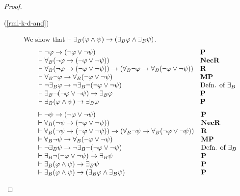 \begin{proof}
\begin{description}
    \item[(\ref{rml-k-d-and})]
    We show that $\vdash {\exists_{B}} (\varphi \land \psi) \rightarrow ({\exists_{B}} \varphi \land {\exists_{B}} \psi)$.
    $$
    \begin{array}{ll}
        \vdash \lnot \varphi \rightarrow (\lnot \varphi \lor \lnot \psi) & {\bf P}\\
        \vdash {\forall_{B}} (\lnot \varphi \rightarrow (\lnot \varphi \lor \lnot \psi)) & {\bf NecR}\\
        \vdash {\forall_{B}} (\lnot \varphi \rightarrow (\lnot \varphi \lor \lnot \psi)) \rightarrow ({\forall_{B}} \lnot \varphi \rightarrow {\forall_{B}} (\lnot \varphi \lor \lnot \psi)) & {\bf R}\\
        \vdash {\forall_{B}} \lnot \varphi \rightarrow {\forall_{B}} (\lnot \varphi \lor \lnot \psi) & {\bf MP}\\
        \vdash \lnot {\exists_{B}} \varphi \rightarrow \lnot {\exists_{B}} \lnot (\lnot \varphi \lor \lnot \psi) & \text{Defn. of ${\exists_{B}}$}\\
        \vdash {\exists_{B}} \lnot (\lnot \varphi \lor \lnot \psi) \rightarrow {\exists_{B}} \varphi  & {\bf P}\\
        \vdash {\exists_{B}} (\varphi \land \psi) \rightarrow {\exists_{B}} \varphi  & {\bf P}\\
    \end{array}
    $$
    $$
    \begin{array}{ll}
        \vdash \lnot \psi \rightarrow (\lnot \varphi \lor \lnot \psi) & {\bf P}\\
        \vdash {\forall_{B}} (\lnot \psi \rightarrow (\lnot \varphi \lor \lnot \psi)) & {\bf NecR}\\
        \vdash {\forall_{B}} (\lnot \psi \rightarrow (\lnot \varphi \lor \lnot \psi)) \rightarrow ({\forall_{B}} \lnot \psi \rightarrow {\forall_{B}} (\lnot \varphi \lor \lnot \psi)) & {\bf R}\\
        \vdash {\forall_{B}} \lnot \psi \rightarrow {\forall_{B}} (\lnot \varphi \lor \lnot \psi) & {\bf MP}\\
        \vdash \lnot {\exists_{B}} \psi \rightarrow \lnot {\exists_{B}} \lnot (\lnot \varphi \lor \lnot \psi) & \text{Defn. of ${\exists_{B}}$}\\
        \vdash {\exists_{B}} \lnot (\lnot \varphi \lor \lnot \psi) \rightarrow {\exists_{B}} \psi  & {\bf P}\\
        \vdash {\exists_{B}} (\varphi \land \psi) \rightarrow {\exists_{B}} \psi  & {\bf P}\\
        \vdash {\exists_{B}} (\varphi \land \psi) \rightarrow ({\exists_{B}} \varphi \land {\exists_{B}} \psi) & {\bf P}
    \end{array}
    $$


\end{description}
\end{proof}
